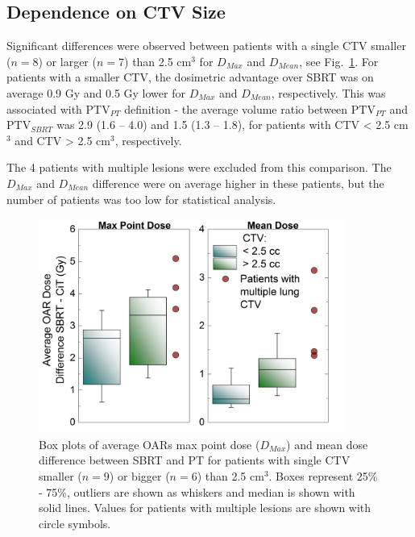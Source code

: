 \documentclass[type=dr, dr=rernat, acm$^3$entcolor=tud7b,colorbacktitle, bigchapter, openright, twoside, 12pt ]{tudthesis}
\begin{document}
\subsection{Dependence on CTV Size}

Significant differences were observed between patients with a single CTV smaller ($n=8$) or larger ($n=7$) than 2.5 cm$^{3}$ for $D_{Max}$ and $D_{Mean}$, see Fig.~\ref{Fig:OAR_boxplots}. For patients with a smaller CTV, the dosimetric advantage over SBRT was on average 0.9 Gy and 0.5 Gy lower for $D_{Max}$ and $D_{Mean}$, respectively. This was associated with PTV$_{PT}$ definition - the average volume ratio between PTV$_{PT}$ and PTV$_{SBRT}$ was 2.9 (1.6 – 4.0) and 1.5 (1.3 – 1.8), for patients with CTV < 2.5 cm$^{3}$ and CTV > 2.5 cm$^{3}$, respectively.

The 4 patients with multiple lesions were excluded from this comparison. The $D_{Max}$ and $D_{Mean}$ difference were on average higher in these patients, but the number of patients was too low for statistical analysis. 


\begin{figure}[H]
\begin{center}
\includegraphics[width=0.9\textwidth]{./Images/Figure4.png}
\caption{Box plots of average OARs max point dose ($D_{Max}$) and mean dose difference between SBRT and PT for patients with single CTV smaller ($n = 9$) or bigger ($n = 6$) than 2.5 cm$^{3}$. Boxes represent 25\% - 75\%, outliers are shown as whiskers and median is shown with solid lines. Values for patients with multiple lesions are shown with circle symbols.}
\label{Fig:OAR_boxplots}
\end{center}
\end{figure}
\end{document}

